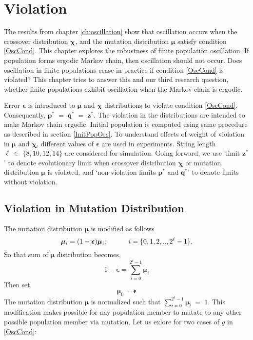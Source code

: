 \chapter{Violation} \label{ch:evolutionary limits}
The results from chapter \ref{ch:oscillation} show that oscillation occurs
when the crossover distribution $\bm{\chi}$, and the mutation distribution $\bm{\mu}$ 
satisfy condition \ref{OscCond}. This chapter explores the robustness of finite population oscillation. 
If population forms ergodic Markov chain, then oscillation should not occur. Does oscillation 
in finite populations cease in practice if condition \ref{OscCond} is violated? 
This chapter tries to answer this and our  
third research question, whether finite populations exhibit oscillation when the Markov chain 
is ergodic.

Error $\bm{\epsilon}$ is introduced to $\bm{\mu}$ and $\bm{\chi}$ distributions to 
violate condition \ref{OscCond}. Consequently, $\bm{p}^\ast \;=\; \bm{q}^\ast \;=\; \bm{z}^\ast$. 
The violation in the distributions are intended to make Markov chain ergodic. Initial population is 
computed using same procedure as described in section \ref{InitPopOsc}. To understand effects of weight 
of violation in $\bm{\mu}$ and $\bm{\chi}$, different values of $\bm{\epsilon}$ are used in experiments. 
String length $\ell \;\in\; \{8, 10, 12, 14\}$ are considered for simulation.
Going forward, we use `limit $\bm{z}^\ast$' to denote evolutionary limit when crossover distribution 
$\bm{\chi}$ or mutation distribution $\bm{\mu}$ is violated, and 
`non-violation limits $\bm{p}^\ast$ and $\bm{q}^\ast$' to denote limits without violation.

\section{Violation in Mutation Distribution}
The mutation distribution $\bm{\mu}$ is modified as follows
\[
\bm{\mu}_i = (1-\bm{\epsilon}) \bm{\mu}_i \hspace{0.01in}; \hspace{30pt} i = \{0, 1, 2,.., 2^{\ell}-1\}.
\]
So that sum of $\bm{\mu}$ distribution becomes, 
\[
1-\bm{\epsilon} = \sum \limits_{i=0}^{2^{\ell}-1} \bm{\mu}_i
\]
Then set
\[
\bm{\mu}_0 = \bm{\epsilon}
\]
The mutation distribution $\bm{\mu}$ is normalized such that  $\sum\limits_{i=0}^{2^{\ell}-1}\bm{\mu}_i \;=\; 1$.
This modification makes possible for any population member to mutate to any other possible population member via mutation. 
Let us exlore for two cases of $g$ in \ref{OscCond}:


